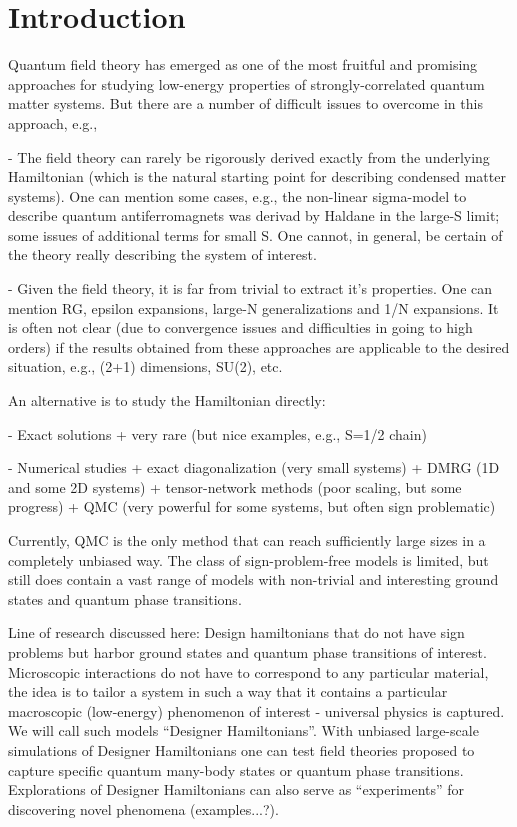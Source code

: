 \documentclass[aps,prb,groupedaddress, twocolumn]{revtex4}
\begin{document}
\section{Introduction}

Quantum field theory has emerged as one of the most fruitful and promising approaches for studying
low-energy properties of strongly-correlated quantum matter systems. But there are a number of 
difficult issues to overcome in this approach, e.g.,

- The field theory can rarely be rigorously derived exactly from the underlying Hamiltonian
  (which is the natural starting point for describing condensed matter systems). One can
  mention some cases, e.g., the non-linear sigma-model to describe quantum antiferromagnets
  was derivad by Haldane in the large-S limit; some issues of additional terms for small S.
  One cannot, in general, be certain of the theory really describing the system of interest.

- Given the field theory, it is far from trivial to extract it's properties. One can mention
  RG, epsilon expansions, large-N generalizations and 1/N expansions. It is often not clear (due
  to convergence issues and difficulties in going to high orders) if the results obtained from 
  these approaches are applicable to the desired situation, e.g., (2+1) dimensions, SU(2), etc.

An alternative is to study the Hamiltonian directly:

- Exact solutions
  + very rare (but nice examples, e.g., S=1/2 chain)

- Numerical studies
  + exact diagonalization (very small systems)
  + DMRG (1D and some 2D systems)
  + tensor-network methods (poor scaling, but some progress)
  + QMC (very powerful for some systems, but often sign problematic)

Currently, QMC is the only method that can reach sufficiently large sizes in a completely
unbiased way. The class of sign-problem-free models is limited, but still does contain a 
vast range of models with non-trivial and interesting ground states and quantum phase transitions.

Line of research discussed here: Design hamiltonians that do not have sign problems but harbor ground states 
and quantum phase transitions of interest. Microscopic interactions do not have to correspond to any particular 
material, the idea is to tailor a system in such a way that it contains a particular macroscopic (low-energy) 
phenomenon of interest - universal physics is captured. We will call such models ``Designer Hamiltonians''.
With unbiased large-scale simulations of Designer Hamiltonians one can test field theories proposed to 
capture specific quantum many-body states or quantum phase transitions. Explorations of Designer Hamiltonians
can also serve as ``experiments'' for discovering novel phenomena (examples...?).
\end{document}
